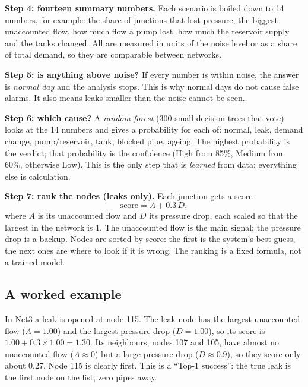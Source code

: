 \documentclass[11pt,a4paper]{article}
\begin{document}
\textbf{Step 4: fourteen summary numbers.} Each scenario is boiled down to 14 numbers, for example: the share of junctions that lost pressure, the biggest unaccounted flow, how much flow a pump lost, how much the reservoir supply and the tanks changed. All are measured in units of the noise level or as a share of total demand, so they are comparable between networks.

\textbf{Step 5: is anything above noise?} If every number is within noise, the answer is \emph{normal day} and the analysis stops. This is why normal days do not cause false alarms. It also means leaks smaller than the noise cannot be seen.

\textbf{Step 6: which cause?} A \emph{random forest} (300 small decision trees that vote) looks at the 14 numbers and gives a probability for each of: normal, leak, demand change, pump/reservoir, tank, blocked pipe, ageing. The highest probability is the verdict; that probability is the confidence (High from 85\%, Medium from 60\%, otherwise Low). This is the only step that is \emph{learned} from data; everything else is calculation.

\textbf{Step 7: rank the nodes (leaks only).} Each junction gets a score
\[\text{score}=A+0.3\,D,\]
where $A$ is its unaccounted flow and $D$ its pressure drop, each scaled so that the largest in the network is 1. The unaccounted flow is the main signal; the pressure drop is a backup. Nodes are sorted by score: the first is the system's best guess, the next ones are where to look if it is wrong. The ranking is a fixed formula, not a trained model.

\subsection{A worked example}
In Net3 a leak is opened at node 115. The leak node has the largest unaccounted flow ($A=1.00$) and the largest pressure drop ($D=1.00$), so its score is $1.00+0.3\times1.00=1.30$. Its neighbours, nodes 107 and 105, have almost no unaccounted flow ($A\approx0$) but a large pressure drop ($D\approx0.9$), so they score only about $0.27$. Node 115 is clearly first. This is a ``Top-1 success'': the true leak is the first node on the list, zero pipes away.
\end{document}
